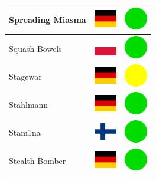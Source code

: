 \documentclass[12pt, a4paper, twoside]{report}
\begin{document}
\begin{center}
\begin{longtable}{|p{5cm}|p{2cm}|p{2cm}|}
 Spreading Miasma                                           & \includegraphics[width=1cm]{../img/flags/de} &   \includegraphics[width=1cm]{../likes/y} \\ \hline
 Squash Bowels                                              & \includegraphics[width=1cm]{../img/flags/pl} &   \includegraphics[width=1cm]{../likes/y} \\ \hline
 Stagewar                                                   & \includegraphics[width=1cm]{../img/flags/de} &   \includegraphics[width=1cm]{../likes/m} \\ \hline
 Stahlmann                                                  & \includegraphics[width=1cm]{../img/flags/de} &   \includegraphics[width=1cm]{../likes/y} \\ \hline
 Stam1na                                                    & \includegraphics[width=1cm]{../img/flags/fi} &   \includegraphics[width=1cm]{../likes/y} \\ \hline
 Stealth Bomber                                             & \includegraphics[width=1cm]{../img/flags/de} &   \includegraphics[width=1cm]{../likes/y} \\ \hline

\end{longtable}
\end{center}
\end{document}
